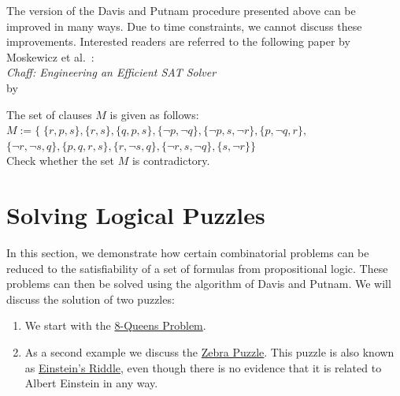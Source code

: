 The version of the Davis and Putnam procedure presented above can be improved in many ways.
Due to time constraints, we cannot discuss these improvements. Interested readers are
referred to the following paper by Moskewicz et al.~\cite{moskewicz:2001}: 
\\[0.2cm]
\hspace*{1.3cm} \textsl{Chaff: Engineering an Efficient SAT Solver} \\
\hspace*{1.3cm} by  

\exerciseEng
The set of clauses $M$ is given as follows: \\[0.2cm]
\hspace*{1.3cm} $M := \bigl\{ \; \{ r, p, s \},
                         \{r, s \}, \{ q, p, s \},
                         \{ \neg p,  \neg q\},
                         \{ \neg p, s,  \neg r\},
                         \{p,  \neg q, r \},$ \\[0.2cm]
\hspace*{2.6cm} $\{ \neg r,  \neg s, q\},
                         \{p, q, r, s \},
                         \{r,  \neg s, q\},
                         \{ \neg r,  s, \neg q\},
                         \{s, \neg r\} \bigr\}$ \\[0.2cm]
Check whether the set $M$ is contradictory.  \eox

\section{Solving Logical Puzzles}
In this section, we demonstrate how certain combinatorial problems can be reduced to the satisfiability of a
set of formulas from propositional logic.  These problems can then be solved using the algorithm of
Davis and Putnam.  We will discuss the solution of two puzzles:
\begin{enumerate}
\item We start with the
      \href{https://en.wikipedia.org/wiki/Eight_queens_puzzle}{8-Queens Problem}. 
\item As a second example we discuss the
      \href{https://en.wikipedia.org/wiki/Zebra_puzzle}{Zebra Puzzle}.  This puzzle is also known as
      \href{https://www.brainzilla.com/logic/zebra/einsteins-riddle/}{Einstein's Riddle},
      even though there is no evidence that it is related to Albert Einstein in any way.
\end{enumerate}

